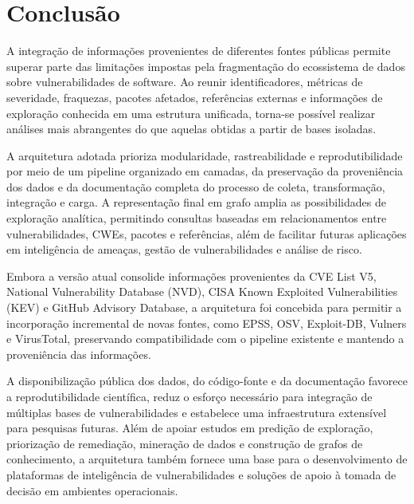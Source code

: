 \section{Conclusão}

A integração de informações provenientes de diferentes fontes públicas permite superar parte das limitações impostas pela fragmentação do ecossistema de dados sobre vulnerabilidades de software. Ao reunir identificadores, métricas de severidade, fraquezas, pacotes afetados, referências externas e informações de exploração conhecida em uma estrutura unificada, torna-se possível realizar análises mais abrangentes do que aquelas obtidas a partir de bases isoladas.

A arquitetura adotada prioriza modularidade, rastreabilidade e reprodutibilidade por meio de um pipeline organizado em camadas, da preservação da proveniência dos dados e da documentação completa do processo de coleta, transformação, integração e carga. A representação final em grafo amplia as possibilidades de exploração analítica, permitindo consultas baseadas em relacionamentos entre vulnerabilidades, CWEs, pacotes e referências, além de facilitar futuras aplicações em inteligência de ameaças, gestão de vulnerabilidades e análise de risco.

Embora a versão atual consolide informações provenientes da CVE List V5, National Vulnerability Database (NVD), CISA Known Exploited Vulnerabilities (KEV) e GitHub Advisory Database, a arquitetura foi concebida para permitir a incorporação incremental de novas fontes, como EPSS, OSV, Exploit-DB, Vulners e VirusTotal, preservando compatibilidade com o pipeline existente e mantendo a proveniência das informações.

A disponibilização pública dos dados, do código-fonte e da documentação favorece a reprodutibilidade científica, reduz o esforço necessário para integração de múltiplas bases de vulnerabilidades e estabelece uma infraestrutura extensível para pesquisas futuras. Além de apoiar estudos em predição de exploração, priorização de remediação, mineração de dados e construção de grafos de conhecimento, a arquitetura também fornece uma base para o desenvolvimento de plataformas de inteligência de vulnerabilidades e soluções de apoio à tomada de decisão em ambientes operacionais.